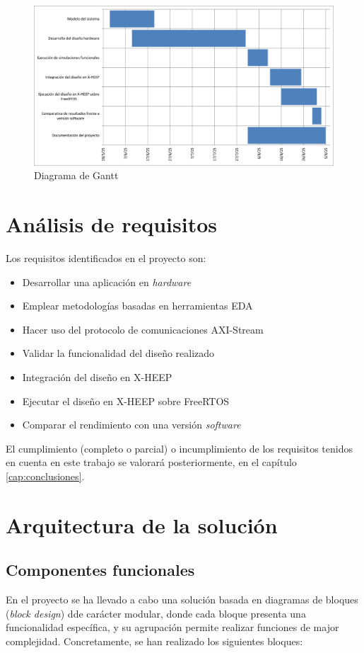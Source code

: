 \begin{figure}[!ht]
  \centering
    \includegraphics[width=15cm]{figures/gantt.png}
  \caption{Diagrama de Gantt}
  \label{fig:gantt}
\end{figure}


\section{Análisis de requisitos}
\label{sec:requisitos}
Los requisitos identificados en el proyecto son:

\begin{itemize}
    \item Desarrollar una aplicación en \textit{hardware}
    \item Emplear metodologías basadas en herramientas EDA
    \item Hacer uso del protocolo de comunicaciones AXI-Stream
    \item Validar la funcionalidad del diseño realizado
    \item Integración del diseño en X-HEEP
    \item Ejecutar el diseño en X-HEEP sobre FreeRTOS
    \item Comparar el rendimiento con una versión \textit{software}
\end{itemize}

El cumplimiento (completo o parcial) o incumplimiento de los requisitos tenidos en cuenta en este trabajo se valorará posteriormente, en el capítulo \ref{cap:conclusiones}.

\section{Arquitectura de la solución}

\subsection{Componentes funcionales}
En el proyecto se ha llevado a cabo una solución basada en diagramas de bloques (\textit{block design}) dde carácter modular, donde cada bloque presenta una funcionalidad específica, y su agrupación permite realizar funciones de major complejidad. Concretamente, se han realizado los siguientes bloques:

